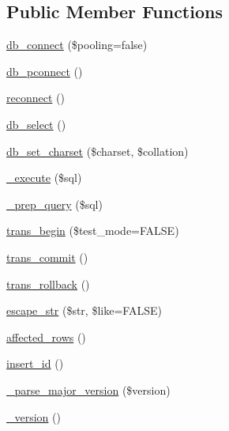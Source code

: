 \subsection*{Public Member Functions}
\begin{DoxyCompactItemize}
\item 
\hyperlink{class_c_i___d_b__sqlsrv__driver_a79f849c88922f2a0becda546b06af182}{db\-\_\-connect} (\$pooling=false)
\item 
\hyperlink{class_c_i___d_b__sqlsrv__driver_a0f69e662bd02de5bcf98647068e7c653}{db\-\_\-pconnect} ()
\item 
\hyperlink{class_c_i___d_b__sqlsrv__driver_a57c19c642ab3023e28d10c50f86ff0a8}{reconnect} ()
\item 
\hyperlink{class_c_i___d_b__sqlsrv__driver_af0c7f2602586ea2050b19fb36baefb24}{db\-\_\-select} ()
\item 
\hyperlink{class_c_i___d_b__sqlsrv__driver_adc8cd12121dc8edda3adcadd88a97e24}{db\-\_\-set\-\_\-charset} (\$charset, \$collation)
\item 
\hyperlink{class_c_i___d_b__sqlsrv__driver_a114ab675d89bf8324a41785fb475e86d}{\-\_\-execute} (\$sql)
\item 
\hyperlink{class_c_i___d_b__sqlsrv__driver_a86af88ef0fa6d44ab4691e3f53270339}{\-\_\-prep\-\_\-query} (\$sql)
\item 
\hyperlink{class_c_i___d_b__sqlsrv__driver_a90e153cf190d273336d77cce930587e1}{trans\-\_\-begin} (\$test\-\_\-mode=F\-A\-L\-S\-E)
\item 
\hyperlink{class_c_i___d_b__sqlsrv__driver_af4fbdcdace4aa94a139b64877601fe9b}{trans\-\_\-commit} ()
\item 
\hyperlink{class_c_i___d_b__sqlsrv__driver_a53f76d4dfcd6ac04fb653982442aeef8}{trans\-\_\-rollback} ()
\item 
\hyperlink{class_c_i___d_b__sqlsrv__driver_aaba16891c8c93600a87075800cc5b72b}{escape\-\_\-str} (\$str, \$like=F\-A\-L\-S\-E)
\item 
\hyperlink{class_c_i___d_b__sqlsrv__driver_a77248aaad33eb132c04cc4aa3f4bc8cb}{affected\-\_\-rows} ()
\item 
\hyperlink{class_c_i___d_b__sqlsrv__driver_a933f2cde8dc7f87875e257d0a4902e99}{insert\-\_\-id} ()
\item 
\hyperlink{class_c_i___d_b__sqlsrv__driver_a1d7c0b00a2f4b332c9ace7892016b37d}{\-\_\-parse\-\_\-major\-\_\-version} (\$version)
\item 
\hyperlink{class_c_i___d_b__sqlsrv__driver_ac997a462bb342f97f414910f0e033fb6}{\-\_\-version} ()
\item 

\end{DoxyCompactItemize}

